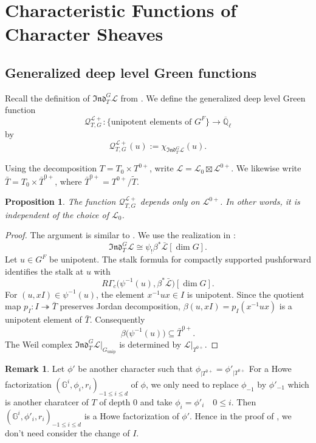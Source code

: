 \documentclass[11pt,letterpaper]{amsart}
\newtheorem{proposition}[theorem]{Proposition}
\theoremstyle{definition}
\newtheorem{remark}[theorem]{Remark}
\numberwithin{equation}{section}
\numberwithin{theorem}{section}
\begin{document}
\section{Characteristic Functions of Character Sheaves}
\label{char}
\subsection{Generalized deep level Green functions}
Recall the definition of $\mathfrak{Ind}^{G}_{T}\mathcal{L}$ from
. We define the generalized deep level Green function
\[
 \mathcal{Q}_{T,G}^{\mathcal L+}:
 \{\text{unipotent elements of }G^F\}
 \longrightarrow\overline{\mathbb Q}_\ell
\]
by
\[
 \mathcal{Q}_{T,G}^{\mathcal L+}(u)
 :=\chi_{\mathfrak{Ind}^{G}_{T}\mathcal L}(u).
\]

Using the decomposition $T=T_0\times T^{0+}$, write
$\mathcal{L}=\mathcal{L}_0\boxtimes\mathcal{L}^{0+}$. We likewise write
$\bar T=T_0\times\bar T^{0+}$, where
$\bar T^{0+}=T^{0+}/\tilde T$.
\begin{proposition}\label{Qpos}
The function $\mathcal{Q}_{T,G}^{\mathcal{L}+}$ depends only on
$\mathcal{L}^{0+}$. In other words, it is independent of the choice of
$\mathcal{L}_0$.
\end{proposition}
\begin{proof}
The argument is similar to \cite[8.3.2]{Lus_Ch2}. We use the realization in :
\[
 \mathfrak{Ind}^{G}_{T}\mathcal L
 \cong \psi_!\beta^*\bar{\mathcal L}[\dim G].
\]
Let $u\in G^F$ be unipotent. The stalk formula for compactly supported
pushforward identifies the stalk at $u$ with
\[
 R\Gamma_c\bigl(\psi^{-1}(u),
                  \beta^*\bar{\mathcal L}\bigr)[\dim G].
\]
For $(u,xI)\in\psi^{-1}(u)$, the element $x^{-1}ux\in I$ is
unipotent.  Since the quotient map $p_I:I\twoheadrightarrow\bar T$
preserves Jordan decomposition, $\beta(u,xI)=p_I(x^{-1}ux)$ is a
unipotent element of $\bar T$. Consequently
\[
 \beta\bigl(\psi^{-1}(u)\bigr)\subseteq \bar T^{0+}.
\]
The Weil complex
$\mathfrak{Ind}^{G}_{T}\mathcal L|_{G_{\mathrm{unip}}}$ is determined by
$\mathcal L|_{T^{0+}}$.
\end{proof}
\begin{remark}\label{changehowe}
    Let $\phi'$ be another character such that $\phi_{|{T^{0+}}}=\phi'_{|{T^{0+}}}$ For a Howe factorization $(\mathbb{G}^i,\phi_i,r_i)_{-1\leq i\leq d}$ of $\phi$, we only need to replace $\phi_{-1}$ by $\phi'_{-1}$ which is another charatcer of $T$ of depth $0$ and take $\phi_{i}=\phi'_{i}\quad 0\leq i$. Then $(\mathbb{G}^i,\phi'_i,r_i)_{-1\leq i\leq d}$ is a Howe factorization of $\phi'$. Hence in the proof of , we don't need consider the change of $I$.
\end{remark}
\end{document}
